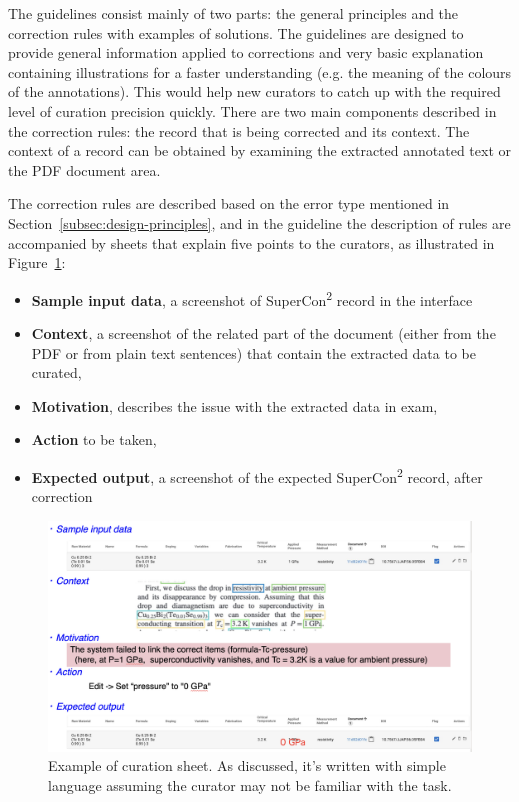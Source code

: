 \documentclass[a4paper]{article}
\begin{document}
The guidelines consist mainly of two parts: the general principles and the correction rules with examples of solutions.
The guidelines are designed to provide general information applied to corrections and very basic explanation containing illustrations for a faster understanding (e.g. the meaning of the colours of the annotations). This would help new curators to catch up with the required level of curation precision quickly. 
There are two main components described in the correction rules: the record that is being corrected and its context. 
The context of a record can be obtained by examining the extracted annotated text or the PDF document area.

The correction rules are described based on the error type mentioned in Section~\ref{subsec:design-principles}, and in the guideline the description of rules are accompanied by sheets that explain five points to the curators, as illustrated in Figure~\ref{fig:example-curation-sheet}:
\begin{itemize}
    \item \textbf{Sample input data}, a screenshot of SuperCon\textsuperscript{2} record in the interface
    \item \textbf{Context}, a screenshot of the related part of the document (either from the PDF or from plain text sentences) that contain the extracted data to be curated,
    \item \textbf{Motivation}, describes the issue with the extracted data in exam, 
    \item \textbf{Action} to be taken, 
    \item \textbf{Expected output}, a screenshot of the expected SuperCon\textsuperscript{2} record, after correction
\end{itemize}


\begin{figure}[ht]
  \centering
  \includegraphics[width=1\textwidth]{images/example-sheet-curation.png} 
  \caption{Example of curation sheet. As discussed, it's written with simple language assuming the curator may not be familiar with the task. }
  \label{fig:example-curation-sheet}
\end{figure}
\end{document}
